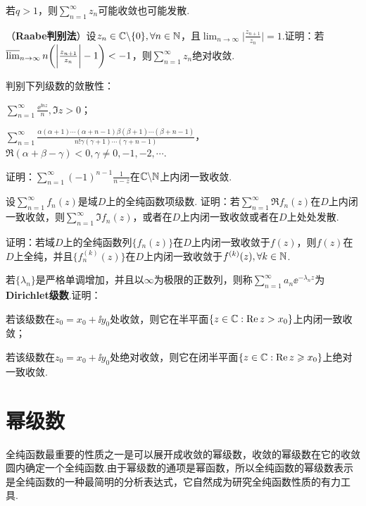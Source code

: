 \begin{xiti}
\begin{enuma}
      \item 若$q>1$，则$\sum_{n=1}^\infty z_n$可能收敛也可能发散.
    \end{enuma}
\item （\textbf{Raabe判别法}）设$z_n\in\mathbb C\backslash\{0\},\forall n\in \mathbb N$，且$\lim_{n\to\infty}\bigg|\frac{z_{n+1}}{z_n}\bigg|=1$.证明：若$\varlimsup_{n\to\infty}n\bigg(\bigg|\frac{z_{n+1}}{z_n}\bigg|-1\bigg)<-1$，则$\sum_{n=1}^\infty z_n$绝对收敛.
\item 判别下列级数的敛散性：
    \begin{enuma}
      \item $\sum_{n=1}^\infty\frac{\ee^{\ii nz}}n,\Im z>0$；
      \item $\sum_{n=1}^\infty\frac{\alpha(\alpha+1)\cdots
          (\alpha+n-1)\beta(\beta+1)\cdots(\beta+n-1)}{n!\gamma(\gamma+1)
          \cdots(\gamma+n-1)}$，$\Re(\alpha+\beta-\gamma)<0,\gamma\ne0,-1,-2,\cdots$.
    \end{enuma}
\item 证明：$\sum_{n=1}^\infty(-1)^{n-1}\frac1{n-z}$在$\mathbb C\backslash\mathbb N$上内闭一致收敛.
\item 设$\sum_{n=1}^\infty f_n(z)$是域$D$上的全纯函数项级数. 证明：若$\sum_{n=1}^\infty\Re f_n(z)$在$D$上内闭一致收敛，则$\sum_{n=1}^\infty \Im f_n(z)$，或者在$D$上内闭一致收敛或者在$D$上处处发散.
\item 证明：若域$D$上的全纯函数列$\{f_n(z)\}$在$D$上内闭一致收敛于$f(z)$，则$f(z)$在$D$上全纯，并且$\{f_n^{(k)}(z)\}$在$D$上内闭一致收敛于$f^{(k)}(z),\forall k\in\mathbb N$.
\item 若$\{\lambda_n\}$是严格单调增加，并且以$\infty$为极限的正数列，则称$\sum_{n=1}^\infty a_n\ee^{-\lambda_n z}$为\textbf{Dirichlet级数}.证明：
    \begin{enuma}
      \item 若该级数在$z_0=x_0+\ii y_0$处收敛，则它在半平面$\{z\in\mathbb C:\operatorname{\textrm{Re}} z>x_0\}$上内闭一致收敛；
      \item 若该级数在$z_0=x_0+\ii y_0$处绝对收敛，则它在闭半平面$\{z\in\mathbb C:\operatorname{\textrm{Re}} z\geqslant x_0\}$上绝对一致收敛.
    \end{enuma}
\end{xiti}

\section{幂级数\label{sec4.2}}
全纯函数最重要的性质之一是可以展开成收敛的幂级数，收敛的幂级数在它的收敛圆内确定一个全纯函数.由于幂级数的通项是幂函数，所以全纯函数的幂级数表示是全纯函数的一种最简明的分析表达式，它自然成为研究全纯函数性质的有力工具.


